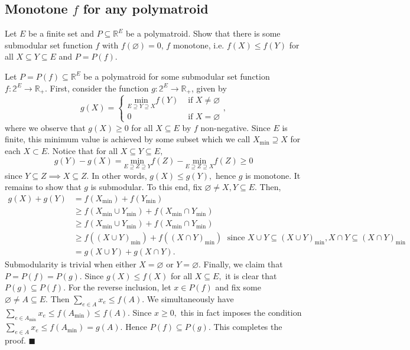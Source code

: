 \documentclass{article}
\let\emptyset\varnothing
\newcommand{\R}{\mathbb{R}}
\begin{document}
  \subsection{Monotone $f$ for any polymatroid}
  \begin{centerframebox}
    Let $E$ be a finite set and $P \subseteq \R^E$ be a polymatroid.
    Show that there is some submodular set function $f$ with $f(\emptyset) = 0$, $f$ monotone, i.e. $f(X) \leq f(Y)$
    for all $X \subseteq Y \subseteq E$ and $P = P(f)$.
  \end{centerframebox}
  Let $P =P(f)\subseteq \R^E$ be a polymatroid for some submodular set function $f :\mathbb{2}^E\rightarrow \mathbb{R}_+$. First, consider the function $g:\mathbb{2}^E\rightarrow \mathbb{R}_+$, given by $$g(X)=\begin{cases}\underset{E\supseteq Y\supseteq X}{\text{min}}f(Y)& \text{ if }X\neq \emptyset \\ 0 & \text{ if }X=\emptyset\end{cases},$$where we observe that $g(X)\geq 0$ for all $X\subseteq E$ by $f$ non-negative. Since $E$ is finite, this minimum value is achieved by some subset which we call $X_{\text{min}}\supseteq X$ for each $X\subset E.$ Notice that for all $X\subseteq Y\subseteq E,$ $$g(Y)-g(X)=\underset{E\supseteq Z\supseteq Y}{\text{min}}f(Z)-\underset{E\supseteq Z\supseteq X}{\text{min}}f(Z)\geq 0$$since $Y\subseteq Z\implies X\subseteq Z.$ In other words, $g(X)\leq g(Y),$ hence $g$ is monotone. It remains to show that $g$ is submodular. To this end, fix $\emptyset\neq X,Y\subseteq E.$ Then,
  \begin{align*}
    g(X)+g(Y)&=f(X_{\text{min}})+f(Y_{\text{min}})\\
    &\geq f(X_{\text{min}}\cup Y_{\text{min}})+f(X_{\text{min}}\cap Y_{\text{min}})\\
    &\geq f(X_{\text{min}}\cup Y_{\text{min}})+f(X_{\text{min}}\cap Y_{\text{min}})\\
    &\geq f((X\cup Y)_{\text{min}})+f((X\cap Y)_{\text{min}})\; \text{ since }X\cup Y\subseteq(X\cup Y)_{\text{min}}, X\cap Y\subseteq(X\cap Y)_{\text{min}}\\
    &=g(X\cup Y)+g(X\cap Y).
  \end{align*}Submodularity is trivial when either $X=\emptyset$ or $Y=\emptyset.$ Finally, we claim that $P=P(f)=P(g).$ Since $g(X)\leq f(X)$ for all $X\subseteq E,$ it is clear that $P(g)\subseteq P(f).$ For the reverse inclusion, let $x\in P(f)$ and fix some $\emptyset \neq A\subseteq E.$ Then $\sum_{e\in A}x_e\leq f(A)$. We simultaneously have $\sum_{e\in A_{\text{min}}}x_e\leq f(A_{\text{min}})\leq f(A)$. Since $x\geq 0,$ this in fact imposes the condition $\sum_{e\in A}x_e\leq f(A_{\text{min}})=g(A).$ Hence $P(f)\subseteq  P(g).$ This completes the proof. $\blacksquare$
\end{document}
